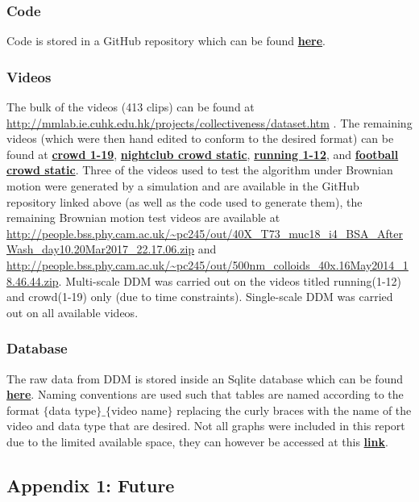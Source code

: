 \documentclass[10pt]{article}
\let\oldhref\href
\renewcommand{\href}[2]{\oldhref{#1}{\bfseries#2}}
\begin{document}
\subsubsection{Code}
Code is stored in a GitHub repository which can be found \href{https://github.com/jordanosborn/CrowdAnalysisDDM}{here}.
\subsubsection{Videos}
The bulk of the videos (413 clips) can be found at \url{http://mmlab.ie.cuhk.edu.hk/projects/collectiveness/dataset.htm} \cite{crowdMotionDB}. The remaining videos (which were then hand edited to conform to the desired format) can be found at \href{https://www.youtube.com/watch?v=nrST7C_mDT8}{crowd 1-19}, \href{https://www.youtube.com/watch?v=lpEF1uyCH44}{nightclub crowd static},  \href{https://www.youtube.com/watch?v=sj2er0LPlH0}{running 1-12}, and \href{https://www.youtube.com/watch?v=AQdZ2OTF7VA}{football crowd static}. Three of the videos used to test the algorithm under Brownian motion were generated by a simulation and are available in the GitHub repository linked above (as well as the code used to generate them), the remaining Brownian motion test videos are available at \url{http://people.bss.phy.cam.ac.uk/~pc245/out/40X_T73_muc18_i4_BSA_AfterWash_day10.20Mar2017_22.17.06.zip} and \url{http://people.bss.phy.cam.ac.uk/~pc245/out/500nm_colloids_40x.16May2014_18.46.44.zip}. Multi-scale DDM was carried out on the videos titled running(1-12) and crowd(1-19) only (due to time constraints). Single-scale DDM was carried out on all available videos.
\subsubsection{Database}
\label{section:database}
The raw data from DDM is stored inside an Sqlite database which can be found \href{https://github.com/jordanosborn/CrowdAnalysisDDM/blob/master/code/crowd.sqlite?raw=true}{here}. Naming conventions are used such that tables are named according to the format $\{$data type$\}\_\{$video name$\}$ replacing the curly braces with the name of the video and data type that are desired. Not all graphs were included in this report due to the limited available space, they can however be accessed at this  \href{https://drive.google.com/drive/folders/1LI3qSCtjwXnbb-hIaWZYloMIHjo4BUsj?usp=sharing}{link}.
\subsection{Appendix 1: Future}
\label{section:future}
\end{document}
